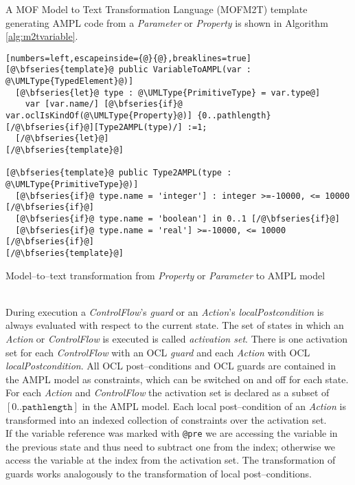 \documentclass[runningheads,a4paper]{llncs}%
\newcommand{\UMLType}[1]{\textsf{\textit{#1}}} %
\newcommand{\UMLReference}[1]{\textsf{\textit{#1}}} %
\begin{document}
A MOF Model to Text Transformation Language\cite{m2t.standard} (MOFM2T) template generating AMPL code from a \UMLType{Parameter} or \UMLType{Property} is shown in Algorithm \ref{alg:m2tvariable}.
\begin{algorithm}
\begin{lstlisting}[numbers=left,escapeinside={@}{@},breaklines=true]
[@\bfseries{template}@ public VariableToAMPL(var : @\UMLType{TypedElement}@)]
  [@\bfseries{let}@ type : @\UMLType{PrimitiveType} = var.type@]
    var [var.name/] [@\bfseries{if}@ var.oclIsKindOf(@\UMLType{Property}@)] {0..pathlength} [/@\bfseries{if}@][Type2AMPL(type)/] :=1;
  [/@\bfseries{let}@]
[/@\bfseries{template}@]

[@\bfseries{template}@ public Type2AMPL(type : @\UMLType{PrimitiveType}@)]
  [@\bfseries{if}@ type.name = 'integer'] : integer >=-10000, <= 10000 [/@\bfseries{if}@]
  [@\bfseries{if}@ type.name = 'boolean'] in 0..1 [/@\bfseries{if}@]
  [@\bfseries{if}@ type.name = 'real'] >=-10000, <= 10000 [/@\bfseries{if}@]
[/@\bfseries{template}@]
\end{lstlisting}%
\caption{Model--to--text transformation from \UMLType{Property} or \UMLType{Parameter} to AMPL model}%
\label{alg:m2tvariable}%
\end{algorithm}\\%
During execution a \UMLType{ControlFlow}'s \UMLReference{guard} or an \UMLType{Action}'s \UMLReference{localPostcondition} is always evaluated with respect to the current state. The set of states in which an \UMLType{Action} or \UMLType{ControlFlow} is executed is called \emph{activation set}. There is one activation set for each \UMLType{ControlFlow} with an OCL \UMLReference{guard} and each \UMLType{Action} with OCL \UMLReference{localPostcondition}. %
All OCL post--conditions and OCL guards are contained in the AMPL model as constraints, which can be switched on and off for each state. %
%
For each \UMLType{Action} and \UMLType{ControlFlow} the activation set is declared as a subset of $\left[0..\texttt{pathlength}\right]$ in the AMPL model. Each local post--condition of an \UMLType{Action} is transformed into an indexed collection of constraints over the activation set.\\
If the variable reference was marked with \verb=@pre= we are accessing the variable in the previous state and thus need to subtract one from the index; otherwise we access the variable at the index from the activation set.%
The transformation of guards works analogously to the transformation of local post--conditions.
\end{document}

